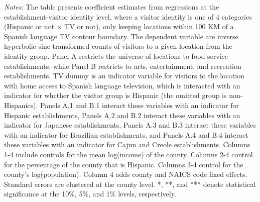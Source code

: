 \begin{table}[!htbp]
{\begin{threeparttable}
\begin{tablenotes}[flushleft]
				\item \textit{Notes:} The table presents coefficient estimates from regressions at the establishment-visitor identity level, where a visitor identity is one of 4 categories (Hispanic or not $\times$ TV or not), only keeping locations within 100 KM of a Spanish language TV contour boundary. The dependent variable are inverse hyperbolic sine transformed counts of visitors to a given location from the identity group. Panel A restricts the universe of locations to food service establishments, while Panel B restricts to arts, entertainment, and recreation establishments. TV dummy is an indicator variable for visitors to the location with home access to Spanish language television, which is interacted with an indicator for whether the visitor group is Hispanic (the omitted group is non-Hispanics). Panels A.1 and B.1 interact these variables with an indicator for Hispanic establishments, Panels A.2 and B.2 interact these variables with an indicator for Japanese establishments, Panels A.3 and B.3 interact these variables with an indicator for Brazilian establishments, and Panels A.4 and B.4 interact these variables with an indicator for Cajun and Creole establishments.   Columns 1-4 include controls for the mean log(income) of the county. Columns 2-4 control for the percentage of the county that is Hispanic. Columns 3-4 control for the county's log(population). Column 4 adds county and NAICS code fixed effects. Standard errors are clustered at the county level. *, **, and *** denote statistical significance at the 10\%, 5\%, and 1\% levels, respectively.
			\end{tablenotes}
		\end{threeparttable}
	}
\end{table}